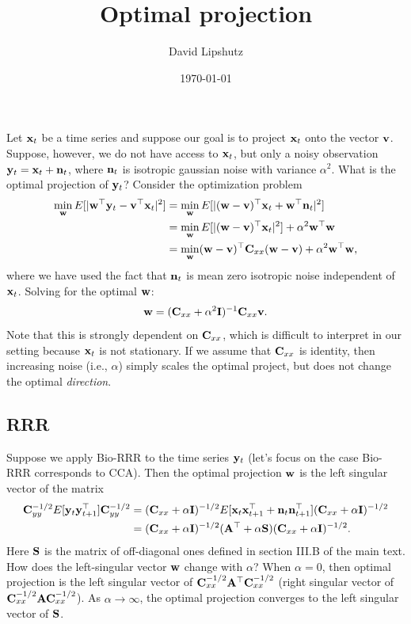 \documentclass[11pt]{article}
\title{Optimal projection}
\author{David Lipshutz}
\date{\today}
\theoremstyle{definition}
\newcommand{\n}{{\bf n}}
\newcommand{\w}{{\bf w}}
\renewcommand{\v}{{\bf v}}
\newcommand{\x}{{\bf x}}
\newcommand{\y}{{\bf y}}
\newcommand{\A}{{\bf A}}
\newcommand{\C}{{\bf C}}
\newcommand{\I}{{\bf I}}
\renewcommand{\S}{{\bf S}}
\begin{document}
\maketitle

Let $\x_t$ be a time series and suppose our goal is to project $\x_t$ onto the vector $\v$. Suppose, however, we do not have access to $\x_t$, but only a noisy observation $\y_t=\x_t+\n_t$, where $\n_t$ is isotropic gaussian noise with variance $\alpha^2$. What is the optimal projection of $\y_t$? Consider the optimization problem
\begin{align*}
    \min_{\w} E[|\w^\top\y_t-\v^\top\x_t|^2]&=\min_\w E[|(\w-\v)^\top\x_t+\w^\top\n_t|^2]\\
    &=\min_\w E[|(\w-\v)^\top\x_t|^2]+\alpha^2\w^\top\w\\
    &=\min_\w (\w-\v)^\top\C_{xx}(\w-\v)+\alpha^2\w^\top\w,
\end{align*}
where we have used the fact that $\n_t$ is mean zero isotropic noise independent of $\x_t$. Solving for the optimal $\w$:
\begin{align*}
    \w=(\C_{xx}+\alpha^2\I)^{-1}\C_{xx}\v.
\end{align*}
Note that this is strongly dependent on $\C_{xx}$, which is difficult to interpret in our setting because $\x_t$ is not stationary. If we assume that $\C_{xx}$ is identity, then increasing noise (i.e., $\alpha$) simply scales the optimal project, but does not change the optimal \textit{direction}.


\subsection{RRR}

Suppose we apply Bio-RRR to the time series $\y_t$ (let's focus on the case Bio-RRR corresponds to CCA). Then the optimal projection $\w$ is the left singular vector of the matrix
\begin{align*}
    \C_{yy}^{-1/2}E[\y_t\y_{t+1}^\top]\C_{yy}^{-1/2}&=(\C_{xx}+\alpha\I)^{-1/2}E[\x_t\x_{t+1}^\top+\n_t\n_{t+1}^\top](\C_{xx}+\alpha\I)^{-1/2}\\
    &=(\C_{xx}+\alpha\I)^{-1/2}(\A^\top+\alpha\S)(\C_{xx}+\alpha\I)^{-1/2}.
\end{align*}
Here $\S$ is the matrix of off-diagonal ones defined in section III.B of the main text. How does the left-singular vector $\w$ change with $\alpha$? When $\alpha=0$, then optimal projection is the left singular vector of $\C_{xx}^{-1/2}\A^\top\C_{xx}^{-1/2}$ (right singular vector of $\C_{xx}^{-1/2}\A\C_{xx}^{-1/2}$). As $\alpha\to\infty$, the optimal projection converges to the left singular vector of $\S$.
\end{document}
